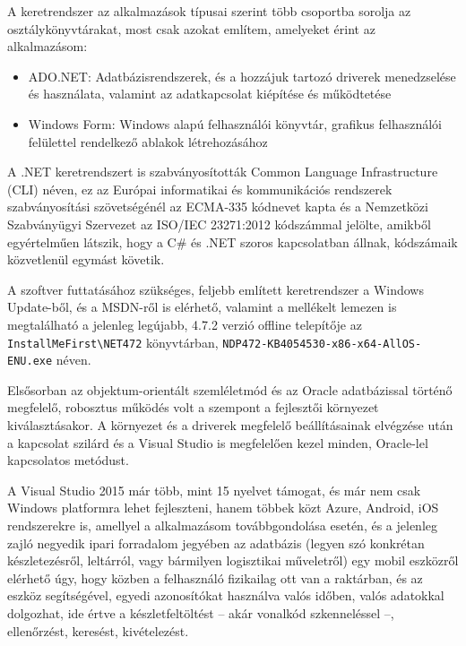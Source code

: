 A keretrendszer az alkalmazások típusai szerint több csoportba sorolja az osztálykönyvtárakat, most csak azokat említem, amelyeket érint az alkalmazásom:
\begin{itemize}
\item ADO.NET: Adatbázisrendszerek, és a hozzájuk tartozó driverek menedzselése és használata, valamint az adatkapcsolat kiépítése és működtetése
\item Windows Form: Windows alapú felhasználói könyvtár, grafikus felhasználói felülettel rendelkező ablakok létrehozásához
\end{itemize}
A .NET keretrendszert is szabványosították Common Language Infrastructure (CLI) néven, ez az Európai informatikai és kommunikációs rendszerek szabványosítási szövetségénél az ECMA-335 kódnevet kapta \cite{ecma_335_cli_dotnet} és a Nemzetközi Szabványügyi Szervezet az ISO/IEC 23271:2012 \cite{iso_iec_cli_dotnet_2012} kódszámmal jelölte, amikből egyértelműen látszik, hogy a C\# és .NET szoros kapcsolatban állnak, kódszámaik közvetlenül egymást követik.

A szoftver futtatásához szükséges, feljebb említett keretrendszer a Windows Update-ből, és a MSDN-ről is elérhető, valamint a mellékelt lemezen is megtalálható a jelenleg legújabb, 4.7.2 verzió offline telepítője az \texttt{InstallMeFirst\textbackslash NET472} könyvtárban, \texttt{NDP472-KB4054530-x86-x64-AllOS-ENU.exe} néven.\par

Elsősorban az objektum-orientált szemléletmód és az Oracle adatbázissal történő megfelelő, robosztus működés volt a szempont a fejlesztői környezet kiválasztásakor. A környezet és a driverek megfelelő beállításainak elvégzése után a kapcsolat szilárd és a Visual Studio is megfelelően kezel minden, Oracle-lel kapcsolatos metódust.\par
A Visual Studio 2015 már több, mint 15 nyelvet támogat, és már nem csak Windows platformra lehet fejleszteni, hanem többek közt Azure, Android, iOS rendszerekre is, amellyel a alkalmazásom továbbgondolása esetén, és a jelenleg zajló negyedik ipari forradalom jegyében az adatbázis (legyen szó konkrétan készletezésről, leltárról, vagy bármilyen logisztikai műveletről) egy mobil eszközről elérhető úgy, hogy közben a felhasználó fizikailag ott van a raktárban, és az eszköz segítségével, egyedi azonosítókat használva valós időben, valós adatokkal dolgozhat, ide értve a készletfeltöltést – akár vonalkód szkenneléssel –, ellenőrzést, keresést, kivételezést.\par

